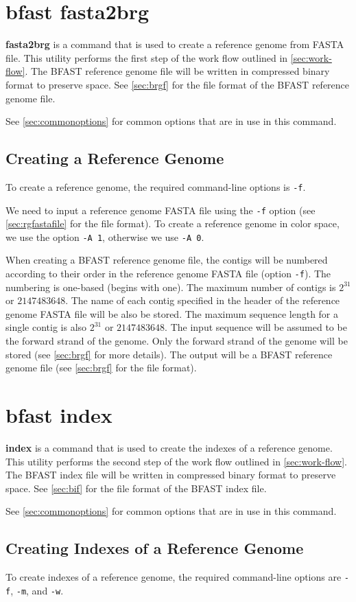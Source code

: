 \documentclass[a4paper,12pt]{book}
\newcommand{\TT}[1]{{\tt #1}} %
\newcommand{\BF}[1]{{\bf #1}} %
\newcommand{\rGFF}{reference genome FASTA file}
\newcommand{\BRGF}{BFAST reference genome file} %
\newcommand{\BIF}{BFAST index file} %
\begin{document}
\section{bfast fasta2brg}
\label{sec:fasta2brg}
\BF{fasta2brg} is a command that is used to create a reference genome from FASTA file.
This utility performs the first step of the work flow outlined in \autoref{sec:work-flow}.
The \BRGF{} will be written in compressed binary format to preserve space.
See \autoref{sec:brgf} for the file format of the \BRGF{}.

See \autoref{sec:commonoptions} for common options that are in use in this command.
\subsection{Creating a Reference Genome}
\label{sec:creating-a-rg}
To create a reference genome, the required command-line options is \TT{-f}.

We need to input a \rGFF{} using the \TT{-f} option (see \autoref{sec:rgfastafile} for the file format).
To create a reference genome in color space, we use the option \TT{-A 1}, otherwise we use \TT{-A 0}.

When creating a \BRGF{}, the contigs will be numbered according to their order in the \rGFF{} (option \TT{-f}).
The numbering is one-based (begins with one).
The maximum number of contigs is $2^{31}$ or $2147483648$.
The name of each contig specified in the header of the \rGFF{} will be also be stored.
The maximum sequence length for a single contig is also $2^{31}$ or $2147483648$. 
The input sequence will be assumed to be the forward strand of the genome.
Only the forward strand of the genome will be stored (see \autoref{sec:brgf} for more details).
The output will be a \BRGF{} (see \autoref{sec:brgf} for the file format).

\section{bfast index}
\label{sec:index}
\BF{index} is a command that is used to create the indexes of a reference genome.
This utility performs the second step of the work flow outlined in \autoref{sec:work-flow}.
The \BIF{} will be written in compressed binary format to preserve space.
See \autoref{sec:bif} for the file format of the \BIF{}.

See \autoref{sec:commonoptions} for common options that are in use in this command.
\subsection{Creating Indexes of a Reference Genome}
\label{sec:creating-bifs}
To create indexes of a reference genome, the required command-line options are \TT{-f}, \TT{-m}, and \TT{-w}.
\end{document}
